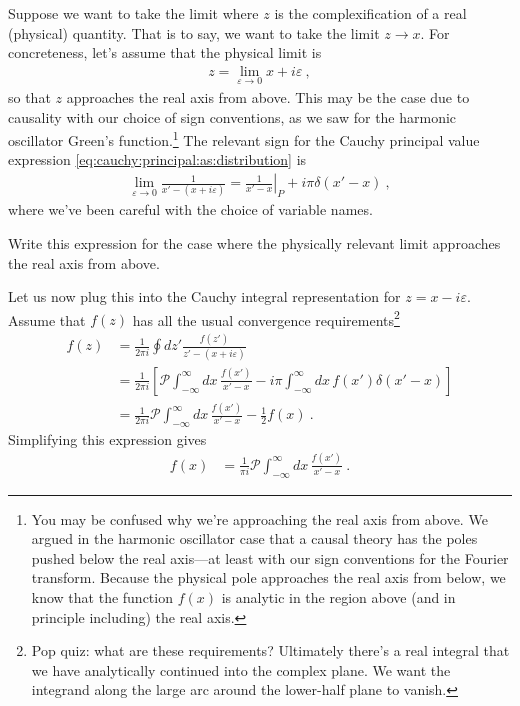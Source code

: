 Suppose we want to take the limit where $z$ is the complexification of a real (physical) quantity. That is to say, we want to take the limit $z\to x$. For concreteness, let's assume that the physical limit is
\begin{align}
	z = \lim_{\varepsilon\to 0} x + i\varepsilon \ ,
\end{align}
so that $z$ approaches the real axis from above. This may be the case due to causality with our choice of sign conventions, as we saw for the harmonic oscillator Green's function.\footnote{You may be confused why we're approaching the real axis from above. We argued in the harmonic oscillator case that a causal theory has the poles pushed below the real axis---at least with our sign conventions for the Fourier transform. Because the physical pole approaches the real axis from below, we know that the function $f(x)$ is analytic in the region above (and in principle including) the real axis.} The relevant sign for the Cauchy principal value expression \eqref{eq:cauchy:principal:as:distribution} is
\begin{align}
	\lim_{\varepsilon\to 0} \frac{1}{x'-(x+i\varepsilon)}
	=
	\left.
	\frac{1}{x'-x}\right|_P
	+ i\pi \delta(x'-x) \ , 
\end{align}
where we've been careful with the choice of variable names.
\begin{exercise}
Write this expression for the case where the physically relevant limit approaches the real axis from above.
\end{exercise}
Let us now plug this into the Cauchy integral representation for $z = x-i\varepsilon$. Assume that $f(z)$ has all the usual convergence requirements\footnote{Pop quiz: what are these requirements? Ultimately there's a real integral that we have analytically continued into the complex plane. We want the integrand along the large arc around the lower-half plane to vanish.}
\begin{align}
	f(z) &= \frac{1}{2\pi i}\oint dz' \frac{f(z')}{z' - (x+i\varepsilon)}
	\\
	&=
	\frac{1}{2\pi i} 
	\left[	
		\mathcal P \int_{-\infty}^\infty dx \, 
		\frac{f(x')}{x'-x}
		-
		i\pi \int_{-\infty}^\infty dx \, f(x')\delta(x'-x)
	\right]
	\\
	&=
	\frac{1}{2\pi i} 
		\mathcal P \int_{-\infty}^\infty dx \, 
		\frac{f(x')}{x'-x}
		-\frac{1}{2}f(x) \ .
\end{align}
Simplifying this expression gives
\begin{align}
	f(x) &= \frac{1}{\pi i} 
		\mathcal P \int_{-\infty}^\infty dx 
		\, \frac{f(x')}{x'-x} \ .
\end{align}
